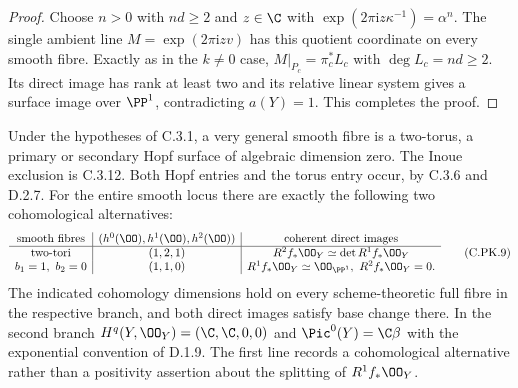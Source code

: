 \begin{proof}
Choose $n>0$ with $nd\ge2$ and $z\in\C$ with
$\exp(2\pi\mathrm i z\kappa^{-1})=\alpha^n$.
The single ambient line $M=\exp(2\pi\mathrm i z v)$
has this quotient coordinate on every smooth fibre.
Exactly as in the $k\ne0$ case,
$M|_{P_c}=\pi_c^*L_c$ with $\deg L_c=nd\ge2$.
Its direct image has rank at least two and its relative
linear system gives a surface image over $\PP^1$,
contradicting $a(Y)=1$. This completes the proof.
\end{proof}

\begin{corollary}
\label{st:C.3.11}
Under the hypotheses of C.3.1, a very general smooth fibre
is a two-torus, a primary or secondary Hopf surface of
algebraic dimension zero. The Inoue exclusion is C.3.12.
Both Hopf
entries and the torus entry occur, by C.3.6 and D.2.7.
For the entire smooth locus there are exactly the following
two cohomological alternatives:
\[
\begin{array}{c|c|c}
\text{smooth fibres}&
 (h^0(\OO),h^1(\OO),h^2(\OO))&
 \text{coherent direct images}\\ \hline
\text{two-tori}&(1,2,1)&
 R^2f_*\OO_Y\simeq\det R^1f_*\OO_Y\\
b_1=1,\ b_2=0&(1,1,0)&
 R^1f_*\OO_Y\simeq\OO_{\PP^1},\
 R^2f_*\OO_Y=0 .
\end{array}
\tag{C.PK.9}
\]
The indicated cohomology dimensions hold on every
scheme-theoretic full fibre in the respective branch,
and both direct images satisfy base change there.
In the second branch
$H^q(Y,\OO_Y)=(\C,\C,0,0)$ and
$\Pic^0(Y)=\C\beta$ with the exponential convention
of D.1.9. The first line records a cohomological
alternative rather than a positivity assertion about
the splitting of $R^1f_*\OO_Y$.
\end{corollary}
